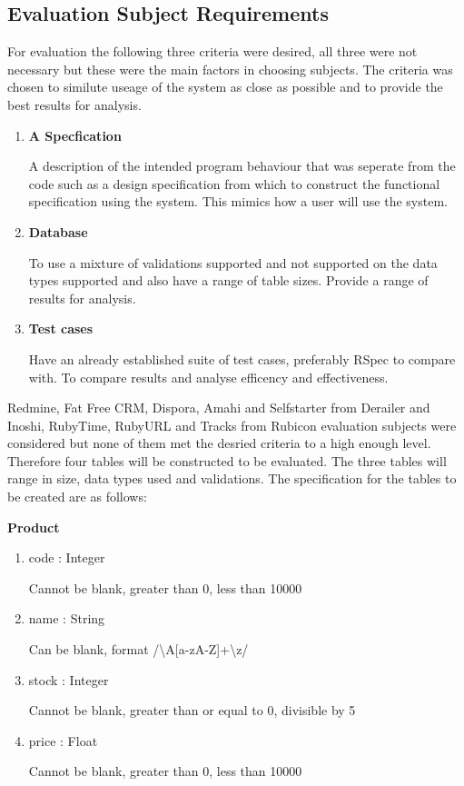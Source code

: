 \documentclass[a4paper,12pt]{article}
\begin{document}
\subsection{Evaluation Subject Requirements}
\par For evaluation the following three criteria were desired, all three were not necessary but these were the main factors in choosing subjects. The criteria was chosen to similute useage of the system as close as possible and to provide the best results for analysis.
\begin{enumerate}
\item \textbf{A Specfication}
\par A description of the intended program behaviour that was seperate from the code such as a design specification from which to construct the functional specification using the system. This mimics how a user will use the system.
\item \textbf{Database}
\par To use a mixture of validations supported and not supported on the data types supported and also have a range of table sizes. Provide a range of results for analysis.
\item \textbf{Test cases}
\par Have an already established suite of test cases, preferably RSpec to compare with. To compare results and analyse efficency and effectiveness.
\end{enumerate}

\cite{near2012rubicon}
\cite{near2014derailer}
\par Redmine, Fat Free CRM, Dispora, Amahi and Selfstarter from Derailer\cite{near2014derailer} and Inoshi, RubyTime, RubyURL and Tracks from Rubicon\cite{near2012rubicon} evaluation subjects were considered but none of them met the desried criteria to a high enough level. Therefore four tables will be constructed to be evaluated. The three tables will range in size, data types used and validations. The specification for the tables to be created are as follows:

\par \textbf{Product}
\begin{enumerate}
\item code : Integer
\par  Cannot be blank, greater than 0, less than 10000 
\item name : String
\par Can be blank, format /{\textbackslash}A[a-zA-Z]+{\textbackslash}z/
\item stock : Integer 
\par Cannot be blank, greater than or equal to 0, divisible by 5
\item price : Float 
\par Cannot be blank, greater than 0, less than 10000 
\end{enumerate}
\end{document}
